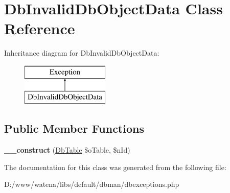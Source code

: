 \hypertarget{class_db_invalid_db_object_data}{\section{Db\-Invalid\-Db\-Object\-Data Class Reference}
\label{class_db_invalid_db_object_data}
}
Inheritance diagram for Db\-Invalid\-Db\-Object\-Data\-:\begin{figure}[H]
\begin{center}
\leavevmode
\includegraphics[height=2.000000cm]{class_db_invalid_db_object_data}
\end{center}
\end{figure}
\subsection*{Public Member Functions}
\begin{DoxyCompactItemize}
\item 
\hypertarget{class_db_invalid_db_object_data_abdc9084187e538330171c40ac8c07275}{{\bfseries \-\_\-\-\_\-construct} (\hyperlink{class_db_table}{Db\-Table} \$o\-Table, \$n\-Id)}\label{class_db_invalid_db_object_data_abdc9084187e538330171c40ac8c07275}

\end{DoxyCompactItemize}


The documentation for this class was generated from the following file\-:\begin{DoxyCompactItemize}
\item 
D\-:/www/watena/libs/default/dbman/dbexceptions.\-php\end{DoxyCompactItemize}

